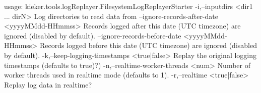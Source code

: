usage: kieker.tools.logReplayer.FilesystemLogReplayerStarter
 -i,--inputdirs <dir1 ... dirN>                      Log directories to read data from
    --ignore-records-after-date <yyyyMMdd-HHmmss>    Records logged after this date
                                                     (UTC timezone) are ignored
                                                     (disabled by default).
    --ignore-records-before-date <yyyyMMdd-HHmmss>   Records logged before this date 
                                                     (UTC timezone) are ignored
                                                     (disabled by default).
 -k,--keep-logging-timestamps <true|false>           Replay the original logging 
                                                     timestamps (defaults to true)?)
 -n,--realtime-worker-threads <num>                  Number of worker threads used in
                                                     realtime mode (defaults to 1).
 -r,--realtime <true|false>                          Replay log data in realtime?